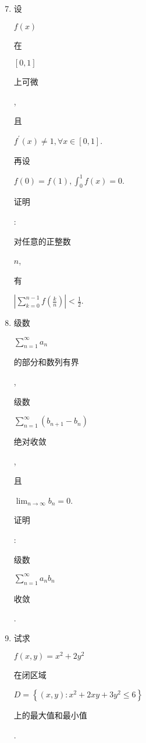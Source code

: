 \documentclass[10pt]{article}
\begin{document}
\begin{enumerate}
  \setcounter{enumi}{6}
  \item \begin{CJK}{UTF8}{mj}设\end{CJK} $f(x)$ \begin{CJK}{UTF8}{mj}在\end{CJK} $[0,1]$ \begin{CJK}{UTF8}{mj}上可微\end{CJK}, \begin{CJK}{UTF8}{mj}且\end{CJK} $f^{\prime}(x) \neq 1, \forall x \in[0,1]$. \begin{CJK}{UTF8}{mj}再设\end{CJK} $f(0)=f(1), \int_{0}^{1} f(x)=0$. \begin{CJK}{UTF8}{mj}证明\end{CJK}: \begin{CJK}{UTF8}{mj}对任意的正整数\end{CJK} $n$, \begin{CJK}{UTF8}{mj}有\end{CJK} $\left|\sum_{k=0}^{n-1} f\left(\frac{k}{n}\right)\right|<\frac{1}{2}$.

  \item \begin{CJK}{UTF8}{mj}级数\end{CJK} $\sum_{n=1}^{\infty} a_{n}$ \begin{CJK}{UTF8}{mj}的部分和数列有界\end{CJK}, \begin{CJK}{UTF8}{mj}级数\end{CJK} $\sum_{n=1}^{\infty}\left(b_{n+1}-b_{n}\right)$ \begin{CJK}{UTF8}{mj}绝对收敛\end{CJK}, \begin{CJK}{UTF8}{mj}且\end{CJK} $\lim _{n \rightarrow \infty} b_{n}=0$. \begin{CJK}{UTF8}{mj}证明\end{CJK}: \begin{CJK}{UTF8}{mj}级数\end{CJK} $\sum_{n=1}^{\infty} a_{n} b_{n}$ \begin{CJK}{UTF8}{mj}收敛\end{CJK}.

  \item \begin{CJK}{UTF8}{mj}试求\end{CJK} $f(x, y)=x^{2}+2 y^{2}$ \begin{CJK}{UTF8}{mj}在闭区域\end{CJK} $D=\left\{(x, y): x^{2}+2 x y+3 y^{2} \leqslant 6\right\}$ \begin{CJK}{UTF8}{mj}上的最大值和最小值\end{CJK}.


\end{enumerate}
\end{document}
